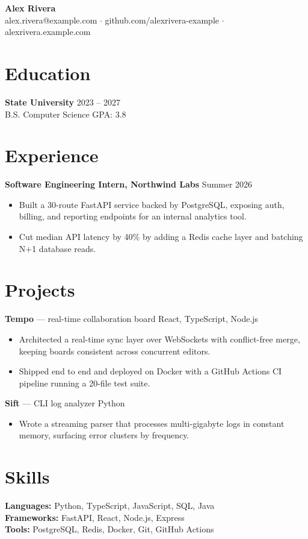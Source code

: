 \documentclass[letterpaper,11pt]{article}
\newcommand{\resumeItem}[1]{\item #1}
\begin{document}
\begin{center}
  {\LARGE \textbf{Alex Rivera}}\\[2pt]
  alex.rivera@example.com $\cdot$ github.com/alexrivera-example $\cdot$ alexrivera.example.com
\end{center}

\section{Education}
\textbf{State University} \hfill 2023 -- 2027\\
B.S. Computer Science \hfill GPA: 3.8

\section{Experience}
\textbf{Software Engineering Intern, Northwind Labs} \hfill Summer 2026
\begin{itemize}
  \resumeItem{Built a 30-route FastAPI service backed by PostgreSQL, exposing auth, billing, and reporting endpoints for an internal analytics tool.}
  \resumeItem{Cut median API latency by 40\% by adding a Redis cache layer and batching N+1 database reads.}
\end{itemize}

\section{Projects}
\textbf{Tempo} — real-time collaboration board \hfill React, TypeScript, Node.js
\begin{itemize}
  \resumeItem{Architected a real-time sync layer over WebSockets with conflict-free merge, keeping boards consistent across concurrent editors.}
  \resumeItem{Shipped end to end and deployed on Docker with a GitHub Actions CI pipeline running a 20-file test suite.}
\end{itemize}

\textbf{Sift} — CLI log analyzer \hfill Python
\begin{itemize}
  \resumeItem{Wrote a streaming parser that processes multi-gigabyte logs in constant memory, surfacing error clusters by frequency.}
\end{itemize}

\section{Skills}
\textbf{Languages:} Python, TypeScript, JavaScript, SQL, Java\\
\textbf{Frameworks:} FastAPI, React, Node.js, Express\\
\textbf{Tools:} PostgreSQL, Redis, Docker, Git, GitHub Actions
\end{document}
